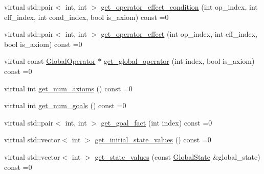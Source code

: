 \begin{DoxyCompactItemize}
\item 
virtual std\-::pair$<$ int, int $>$ \hyperlink{classAbstractTask_a08f0a9248a99ccd0a1fdee940e0c0c4e}{get\-\_\-operator\-\_\-effect\-\_\-condition} (int op\-\_\-index, int eff\-\_\-index, int cond\-\_\-index, bool is\-\_\-axiom) const =0
\item 
virtual std\-::pair$<$ int, int $>$ \hyperlink{classAbstractTask_a4244a150e31b841e65f72ce89fa6ddad}{get\-\_\-operator\-\_\-effect} (int op\-\_\-index, int eff\-\_\-index, bool is\-\_\-axiom) const =0
\item 
virtual const \hyperlink{classGlobalOperator}{Global\-Operator} $\ast$ \hyperlink{classAbstractTask_ad0335ea9f89fa54b846780b55fad2545}{get\-\_\-global\-\_\-operator} (int index, bool is\-\_\-axiom) const =0
\item 
virtual int \hyperlink{classAbstractTask_a0e713664080d2a70036b6307779e7593}{get\-\_\-num\-\_\-axioms} () const =0
\item 
virtual int \hyperlink{classAbstractTask_a4e8335bdbfad228faf76e3c085d2ae4a}{get\-\_\-num\-\_\-goals} () const =0
\item 
virtual std\-::pair$<$ int, int $>$ \hyperlink{classAbstractTask_a737c7aca71dbf64b673236a0af4d8dde}{get\-\_\-goal\-\_\-fact} (int index) const =0
\item 
virtual std\-::vector$<$ int $>$ \hyperlink{classAbstractTask_a9de0ce6fb5349cc114cef522c54c595e}{get\-\_\-initial\-\_\-state\-\_\-values} () const =0
\item 
virtual std\-::vector$<$ int $>$ \hyperlink{classAbstractTask_a047d223704b817c72274f42c05fe3c7d}{get\-\_\-state\-\_\-values} (const \hyperlink{classGlobalState}{Global\-State} \&global\-\_\-state) const =0
\end{DoxyCompactItemize}


